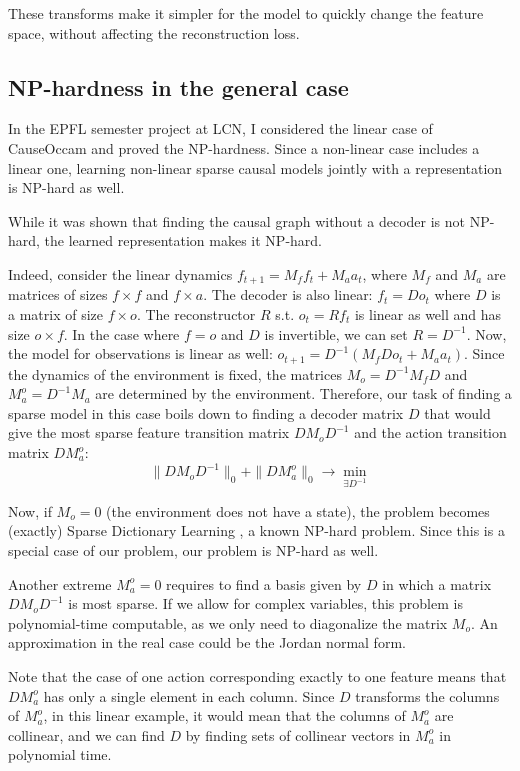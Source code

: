\documentclass[a4paper,11pt,oneside]{report}
\newcommand{\sysname}{CauseOccam\xspace}
\begin{document}
These transforms make it simpler for the model to quickly change the feature space, without affecting the reconstruction loss.

\subsection{NP-hardness in the general case}
In the EPFL semester project at LCN, I considered the linear case of \sysname and proved the NP-hardness. Since a non-linear case includes a linear one, learning non-linear sparse causal models jointly with a representation is NP-hard as well.

While it was shown \cite{Claassen2013} that finding the causal graph without a decoder is not NP-hard, the learned representation makes it NP-hard.

Indeed, consider the linear dynamics $f_{t+1}=M_ff_t+M_aa_t$, where $M_f$ and $M_a$ are matrices of sizes $f\times f$ and $f\times a$. The decoder is also linear: $f_t=Do_t$ where $D$ is a matrix of size $f\times o$. The reconstructor $R$ s.t. $o_t=Rf_t$ is linear as well and has size $o\times f$. In the case where $f=o$ and $D$ is invertible, we can set $R=D^{-1}$. Now, the model for observations is linear as well: $o_{t+1}=D^{-1}\left(M_fDo_t+M_aa_t\right)$. Since the dynamics of the environment is fixed, the matrices $M_o=D^{-1}M_fD$ and $M_a^{o}=D^{-1}M_a$ are determined by the environment. Therefore, our task of finding a sparse model in this case boils down to finding a decoder matrix $D$ that would give the most sparse feature transition matrix $DM_oD^{-1}$ and the action transition matrix $DM_a^{o}$:
$$
\|DM_oD^{-1}\|_0+\|DM_a^{o}\|_0\to\min\limits_{\exists D^{-1}}
$$

Now, if $M_o=0$ (the environment does not have a state), the problem becomes (exactly) Sparse Dictionary Learning \cite{Vincent2002}, a known NP-hard problem. Since this is a special case of our problem, our problem is NP-hard as well.

Another extreme $M_a^o=0$ requires to find a basis given by $D$ in which a matrix $DM_oD^{-1}$ is most sparse. If we allow for complex variables, this problem is polynomial-time computable, as we only need to diagonalize the matrix $M_o$. An approximation in the real case could be the Jordan normal form.

Note that the case of one action corresponding exactly to one feature \cite{Thomas2018,Corneil2018} means that $DM_a^o$ has only a single element in each column. Since $D$ transforms the columns of $M_a^o$, in this linear example, it would mean that the columns of $M_a^o$ are collinear, and we can find $D$ by finding sets of collinear vectors in $M_a^o$ in polynomial time.
\end{document}
